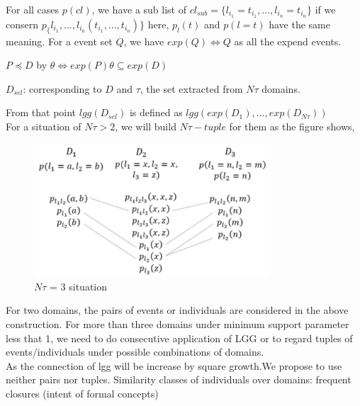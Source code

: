 For all cases $p(cl)$, we have a sub list of 
$cl_{sub}=\{l_{i_1} = t_{i_1},...,l_{i_n}=t_{i_n}\}$
if we consern 
$p_\{l_{i_1},...,l_{i_n}(t_{i_1},...,t_{i_n})\}$ here, 
$p_l(t)$ 
and $p(l=t)$ have the same meaning. For a event set $Q$, we have $exp(Q)\iff Q$ as all the expend events.
\begin{fact}
$P \preceq D$ by $\theta \iff exp(P)\theta \subseteq exp(D)$
\end{fact}
\begin{definition}
$D_{sel}$: corresponding to $D$ and $\tau$, the set extracted from $N\tau$ domains.
\end{definition}
From that point $lgg(D_{sel})$ is defined as $lgg({exp(D_1),...,exp(D_{N\tau })})$
\\
For a situation of $N\tau > 2$, we will build $N\tau - tuple$ for them as the figure shows,
\begin{figure}[!h]
\centering
\includegraphics[width=250pt]{./pictures/0303-3.png}
\caption{$N\tau$ = 3 situation}
\end{figure}
For two domains, the pairs of events or individuals are considered in the above construction.
For more than three domains under minimum support parameter less that 1, we need to do consecutive application of LGG or to regard tuples of events/individuals under possible combinations of domains.\\
As the connection of lgg will be increase by square growth.We propose to use neither pairs nor tuples. Similarity classes of individuals over domains: frequent closures (intent of formal concepts)
